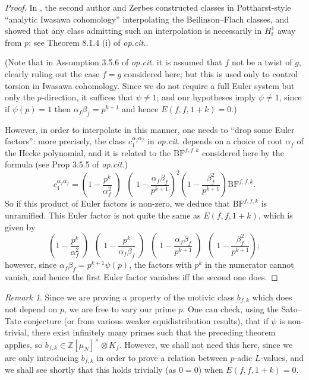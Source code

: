 \documentclass[11pt, a4paper, reqno]{amsart}
\theoremstyle{definition}
\theoremstyle{plain}
\theoremstyle{remark}
\newtheorem*{remark}{Remark}
\DeclareMathOperator{\et}{\acute{e}t}
\newcommand{\numberset}{\mathbb}
\newcommand{\Z}{\numberset{Z}}
\newcommand{\BF}{\mathrm{BF}}
\begin{document}
  \begin{proof}
   In \cite{loefflerzerbes16}, the second author and Zerbes constructed classes in Pottharst-style ``analytic Iwasawa cohomology'' interpolating the Beilinson--Flach classes, and showed that any class admitting such an interpolation is necessarily in $H^1_{\mathrm{f}}$ away from $p$; see Theorem 8.1.4 (i) of \emph{op.cit.}.

   (Note that in Assumption 3.5.6 of \emph{op.cit.} it is assumed that $f$ not be a twist of $g$, clearly ruling out the case $f = g$ considered here; but this is used only to control torsion in Iwasawa cohomology. Since we do not require a full Euler system but only the $p$-direction, it suffices that $\psi \ne 1$; and our hypotheses imply $\psi \ne 1$, since if $\psi(p) = 1$ then $\alpha_f \beta_f = p^{k + 1}$ and hence $E(f, f, 1 + k) = 0$.)

   However, in order to interpolate in this manner, one needs to ``drop some Euler factors'': more precisely, the class $c_1^{\alpha_f \alpha_f}$ in \emph{op.cit.} depends on a choice of root $\alpha_f$ of the Hecke polynomial, and it is related to the $\BF^{f, f, k}_{\et}$ considered here by the formula (see Prop 3.5.5 of \emph{op.cit.})
   \[ c_1^{\alpha_f \alpha_f} = \left(1 - \frac{p^k}{\alpha_f^2}\middle)
   \middle(1 - \frac{\alpha_f \beta_f}{p^{k+1}}\right)^2
   \left(1 - \frac{\beta_f^2}{p^{k+1}}\right)
    \BF^{f, f, k}_{\et}. \]
   So if this product of Euler factors is non-zero, we deduce that $\BF^{f, f, k}_{\et}$ is unramified. This Euler factor is not quite the same as $E(f, f, 1 + k)$, which is given by
   \[ \left(1 - \frac{p^k}{\alpha_f^2}\middle)
      \middle(1 - \frac{p^k}{\alpha_f \beta_f}\middle)
      \middle(1 - \frac{\alpha_f \beta_f}{p^{k+1}}\middle)
      \middle(1 - \frac{\beta_f^2}{p^{k+1}}\right) ;\]
   however, since $\alpha_f \beta_f = p^{k+1} \psi(p)$, the factors with $p^k$ in the numerator cannot vanish, and hence the first Euler factor vanishes iff the second one does.
  \end{proof}

  \begin{remark}
   Since we are proving a property of the motivic class $b_{f, k}$ which does not depend on $p$, we are free to vary our prime $p$. One can check, using the Sato--Tate conjecture (or from various weaker equidistribution results), that if $\psi$ is non-trivial, there exist infinitely many primes such that the preceding theorem applies, so $b_{f, k} \in \Z[\mu_N]^\times \otimes K_f$. However, we shall not need this here, since we are only introducing $b_{f, k}$ in order to prove a relation between $p$-adic $L$-values, and we shall see shortly that this holds trivially (as $0 = 0$) when $E(f, f, 1 + k) = 0$.
  \end{remark}
\end{document}
